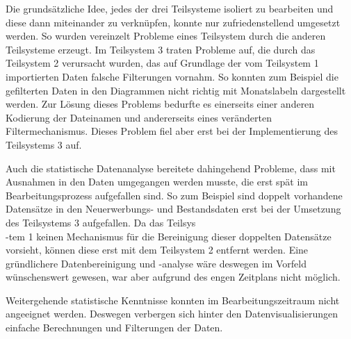 Die grundsätzliche Idee, jedes der drei Teilsysteme isoliert zu bearbeiten und diese dann miteinander zu verknüpfen, 
konnte nur zufriedenstellend umgesetzt werden. So wurden vereinzelt Probleme eines Teilsystem durch die anderen Teilsysteme erzeugt. 
Im Teilsystem 3 traten Probleme auf, die durch das Teilsystem 2 verursacht wurden, das auf Grundlage der 
vom Teilsystem 1 importierten Daten falsche Filterungen vornahm. So konnten zum Beispiel die gefilterten Daten 
in den Diagrammen nicht richtig mit Monatslabeln dargestellt werden. Zur Lösung dieses Problems bedurfte es einerseits einer 
anderen Kodierung der Dateinamen und andererseits eines veränderten Filtermechanismus. Dieses Problem fiel aber erst bei der 
Implementierung des Teilsystems 3 auf. 

Auch die statistische Datenanalyse bereitete dahingehend Probleme, dass mit Ausnahmen in den Daten umgegangen werden musste, die erst spät im Bearbeitungsprozess aufgefallen sind. 
So zum Beispiel sind doppelt vorhandene Datensätze in den Neuerwerbungs- und Bestandsdaten erst bei der Umsetzung des Teilsystems 3
aufgefallen. Da das Teilsys\\-tem 1 keinen Mechanismus für die Bereinigung dieser doppelten Datensätze vorsieht, können diese erst mit dem Teilsystem 2 entfernt werden.
Eine gründlichere Datenbereinigung und -analyse wäre deswegen im Vorfeld wünschenswert gewesen, war aber aufgrund des engen Zeitplans nicht möglich.





Weitergehende statistische Kenntnisse konnten im Bearbeitungszeitraum nicht angeeignet werden. Deswegen verbergen sich hinter den Datenvisualisierungen einfache Berechnungen und Filterungen der Daten.

